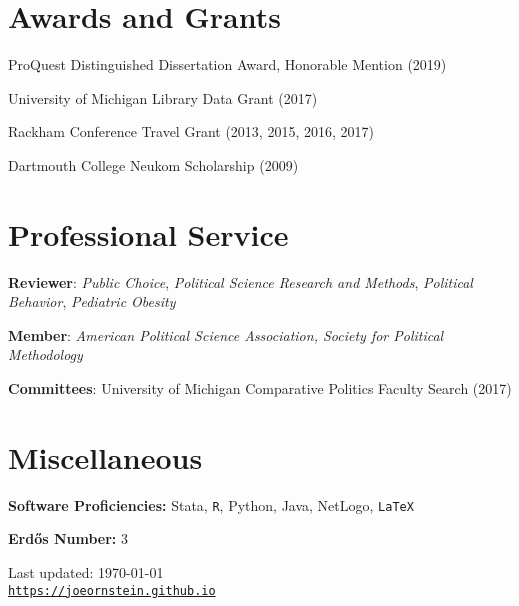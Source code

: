 \documentclass[letterpaper]{article}
\def\footerlink{https://joeornstein.github.io}
\renewenvironment{itemize}{
  \begin{list}{}{
    \setlength{\leftmargin}{1.5em}
  }
}{
  \end{list}
}
\begin{document}
\section*{Awards and Grants}
\begin{itemize}
\item ProQuest Distinguished Dissertation Award, Honorable Mention (2019)
\item University of Michigan Library Data Grant (2017)
\item Rackham Conference Travel Grant (2013, 2015, 2016, 2017)
\item Dartmouth College Neukom Scholarship (2009)
\end{itemize}

\hrulefill

\section*{Professional Service}

\begin{itemize}
\item \textbf{Reviewer}: \textit{Public Choice}, \textit{Political Science Research and Methods}, \textit{Political Behavior}, \textit{Pediatric Obesity}
\item \textbf{Member}: \textit{American Political Science Association, Society for Political Methodology}
\item \textbf{Committees}: University of Michigan Comparative Politics Faculty Search (2017)
\end{itemize}

\hrulefill

\section*{Miscellaneous}
\begin{itemize}
\item \textbf{Software Proficiencies:} Stata, {\tt R}, Python, Java, NetLogo, {\tt LaTeX}
\item \textbf{Erd\H{o}s Number:} 3
\end{itemize}

\bigskip

\begin{center}
  \begin{footnotesize}
    Last updated: \today \\
    \href{\footerlink}{\texttt{\footerlink}}
  \end{footnotesize}
\end{center}
\end{document}
